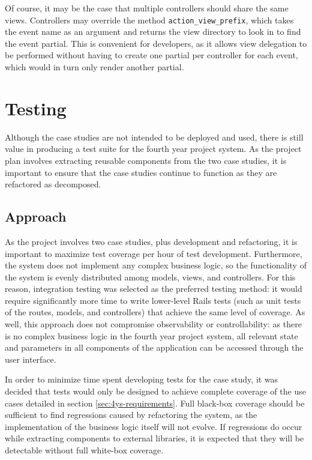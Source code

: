 \documentclass[document.tex]{subfiles}
\begin{document}
Of course, it may be the case that multiple controllers should share the same views. Controllers may override the method \verb!action_view_prefix!, which takes the event name as an argument and returns the view directory to look in to find the event partial. This is convenient for developers, as it allows view delegation to be performed without having to create one partial per controller for each event, which would in turn only render another partial.


\section {Testing}

Although the case studies are not intended to be deployed and used, there is still value in producing a test suite for the fourth year project system.
As the project plan involves extracting reusable components from the two case studies, it is important to ensure that the case studies continue to function as they are refactored as decomposed.


\subsection {Approach}

As the project involves two case studies, plus development and refactoring,
it is important to maximize test coverage per hour of test development. Furthermore, the system does not implement any complex business logic, so the functionality of the system is evenly distributed among models, views, and controllers. For this reason, integration testing was selected as the preferred testing method: it would require significantly more time to write lower-level Rails tests (such as unit tests of the routes, models, and controllers) that achieve the same level of coverage. As well, this approach does not compromise observability or controllability: as there is no complex business logic in the fourth year project system, all relevant state and parameters in all components of the application can be accessed through the user interface.

In order to minimize time spent developing tests for the case study, it was decided that tests would only be designed to achieve complete coverage of the use cases detailed in section \ref{sec:4ys-requirements}. Full black-box coverage should be sufficient to find regressions caused by refactoring the system, as the implementation of the business logic itself will not evolve. If regressions do occur while extracting components to external libraries, it is expected that they will be detectable without full white-box coverage.
\end{document}
